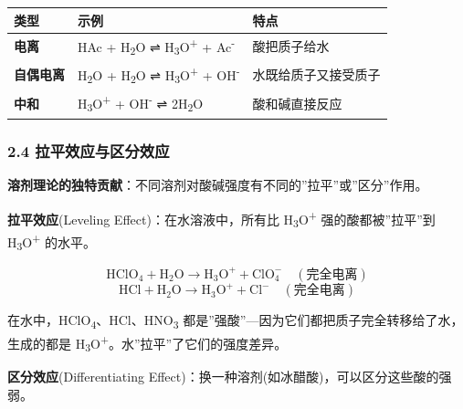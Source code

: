 \documentclass[a4paper,11pt]{ctexart}
\newcounter{none}
\begin{document}
{\def\LTcaptype{none} %
\begin{longtable}[]{@{}
  >{\raggedright\arraybackslash}p{}
  >{\raggedright\arraybackslash}p{}
  >{\raggedright\arraybackslash}p{}@{}}
\toprule\noalign{}
\begin{minipage}[b]{\linewidth}\raggedright
类型
\end{minipage} & \begin{minipage}[b]{\linewidth}\raggedright
示例
\end{minipage} & \begin{minipage}[b]{\linewidth}\raggedright
特点
\end{minipage} \\
\midrule\noalign{}
\endhead
\bottomrule\noalign{}
\endlastfoot
\textbf{电离} & HAc + H\textsubscript{2}O ⇌ H\textsubscript{3}O\textsuperscript{+} + Ac\textsuperscript{-} & 酸把质子给水 \\
\textbf{自偶电离} & H\textsubscript{2}O + H\textsubscript{2}O ⇌ H\textsubscript{3}O\textsuperscript{+} + OH\textsuperscript{-} & 水既给质子又接受质子 \\
\textbf{中和} & H\textsubscript{3}O\textsuperscript{+} + OH\textsuperscript{-} ⇌ 2H\textsubscript{2}O & 酸和碱直接反应 \\
\end{longtable}
}

\subsubsection{2.4 拉平效应与区分效应}\label{ux62c9ux5e73ux6548ux5e94ux4e0eux533aux5206ux6548ux5e94}

\textbf{溶剂理论的独特贡献}：不同溶剂对酸碱强度有不同的''拉平''或''区分''作用。

\textbf{拉平效应}(Leveling Effect)：在水溶液中，所有比 H\textsubscript{3}O\textsuperscript{+} 强的酸都被''拉平''到 H\textsubscript{3}O\textsuperscript{+} 的水平。

\[
\mathrm{HClO_4 + H_2O \to H_3O^+ + ClO_4^-} \quad (\text{完全电离})
\]
\[
\mathrm{HCl + H_2O \to H_3O^+ + Cl^-} \quad (\text{完全电离})
\]

在水中，HClO\textsubscript{4}、HCl、HNO\textsubscript{3} 都是''强酸''---因为它们都把质子完全转移给了水，生成的都是 H\textsubscript{3}O\textsuperscript{+}。水''拉平''了它们的强度差异。

\textbf{区分效应}(Differentiating Effect)：换一种溶剂(如冰醋酸)，可以区分这些酸的强弱。
\end{document}
